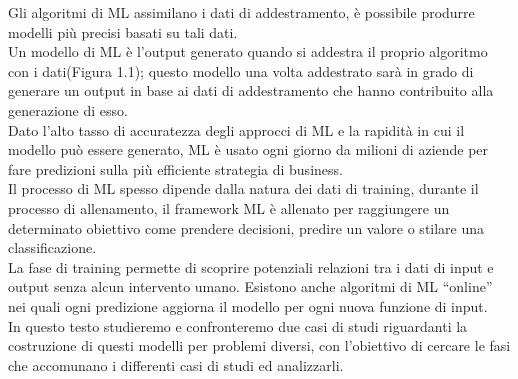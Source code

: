 \documentclass[../tesi.tex]{subfiles}
\begin{document}
Gli algoritmi di ML assimilano i dati di addestramento, è possibile produrre modelli più precisi basati su tali dati.\\
Un modello di ML è l’output generato quando si addestra il proprio algoritmo con i dati(Figura 1.1); questo modello una volta addestrato sarà in grado di generare un output in base ai dati di addestramento che hanno contribuito alla generazione di esso.\\
Dato l’alto tasso di accuratezza degli approcci di ML e la rapidità in cui il modello può essere generato, ML è usato ogni giorno da milioni di aziende per fare predizioni sulla più efficiente strategia di business.\\
Il processo di ML spesso dipende dalla natura dei dati di training, durante il processo di allenamento, il framework ML è allenato per raggiungere un determinato obiettivo come prendere decisioni, predire un valore o stilare una classificazione.\\
La fase di training permette di scoprire potenziali relazioni tra i dati di input e output senza alcun intervento umano.
Esistono anche algoritmi di ML ``online'' nei quali ogni predizione aggiorna il modello per ogni nuova funzione di input.\\
In questo testo studieremo e confronteremo due casi di studi riguardanti la costruzione di questi modelli per problemi diversi, con l’obiettivo di cercare le fasi che accomunano i differenti casi di studi ed analizzarli. 
\end{document}
